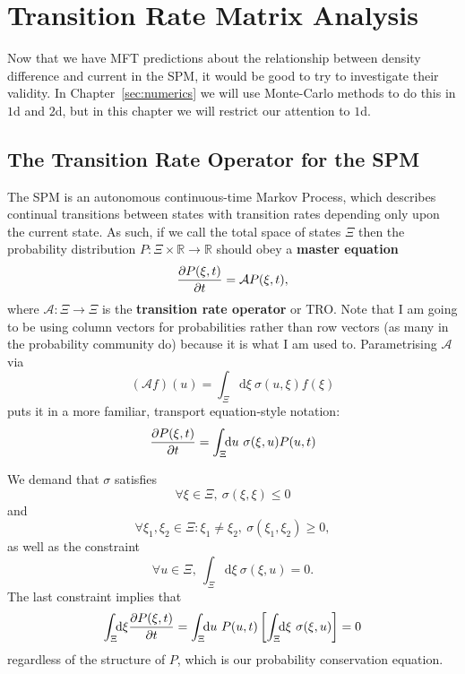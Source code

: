 \chapter{Transition Rate Matrix Analysis} 
\label{sec:transRateChapter}
Now that we have MFT predictions about the relationship between density difference and
current in the SPM, it would be good to try to investigate their validity. In Chapter~\ref{sec:numerics} we will use Monte-Carlo methods to do this in $1$d and $2$d, but in this chapter we will restrict our attention to $1$d.

\section{The Transition Rate Operator for the SPM} \label{sec:TRMGeneralResults}
The SPM is an autonomous continuous-time Markov Process, which describes continual transitions between states
with transition rates depending only upon the current state. As such, if we call the total space of
states $\Xi$ then the probability distribution $P: \Xi \times \mathbb{R} \rightarrow  \mathbb{R}$ should obey a \textbf{master equation}
\begin{equation} \label{eq:masterEq}
 \frac{\partial P(\xi, t)}{\partial t} = \mathcal{A} P(\xi, t),
\end{equation}
where $\mathcal{A}:\Xi \rightarrow \Xi$ is the \textbf{transition rate operator}
or TRO. Note that I am going to be using column vectors for probabilities rather than
row vectors (as many in the probability community do) because it is what I am used to.
Parametrising $\mathcal{A}$ via 
\begin{equation}
 (\mathcal{A}f)(u) = \int_\Xi \! \! \mathrm{d}  \xi \ \sigma (u, \xi) f(\xi)
\end{equation}
puts it in a more familiar, transport equation-style notation:
\begin{equation}
 \frac{\partial P(\xi, t)}{\partial t} = \int_\Xi \! \! \mathrm{d}  u \ \sigma (\xi, u) P(u, t)
\end{equation}

We demand that $\sigma$ satisfies
\begin{equation}
 \forall \xi \in \Xi, \ \sigma (\xi , \xi) \le 0 
\end{equation}
and
\begin{equation}
 \forall \xi_1 , \xi_2 \in \Xi : \xi_1 \ne \xi_2 , \ \sigma (\xi_1 , \xi_2) \ge 0 ,
\end{equation}
as well as the constraint
\begin{equation}
 \forall u \in \Xi , \ \int_\Xi \! \! \mathrm{d}  \xi \ \sigma (\xi, u) = 0.
\end{equation}
The last constraint implies that
\begin{equation}
 \int_\Xi \! \! \mathrm{d}  \xi \frac{\partial P(\xi, t)}{\partial t} = \int_\Xi \! \! \mathrm{d}  u \ P(u, t) \left[ \int_\Xi \! \! \mathrm{d}  \xi \ \sigma (\xi, u) \right] = 0
\end{equation}
regardless of the structure of $P$, which is our probability conservation equation.

